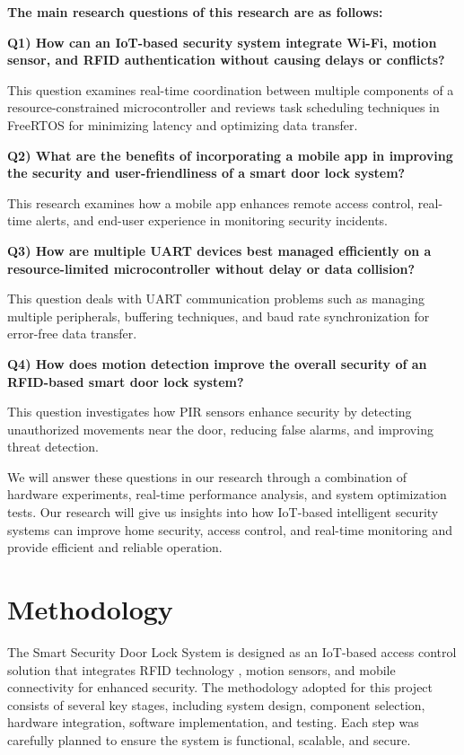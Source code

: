 \documentclass[a4paper]{scrartcl}
\begin{document}
\textbf{The main research questions of this research are as follows:
}
\vspace{8pt} %

\textbf{Q1) How can an IoT-based security system integrate Wi-Fi, motion sensor, and RFID authentication without causing delays or conflicts?}

This question examines real-time coordination between multiple components of a resource-constrained microcontroller and reviews task scheduling techniques in FreeRTOS for minimizing latency and optimizing data transfer.

\vspace{8pt}

\textbf{Q2) What are the benefits of incorporating a mobile app in improving the security and user-friendliness of a smart door lock system?}

This research examines how a mobile app enhances remote access control, real-time alerts, and end-user experience in monitoring security incidents.

\vspace{8pt}

\textbf{Q3) How are multiple UART devices best managed efficiently on a resource-limited microcontroller without delay or data collision?}

This question deals with UART communication problems such as managing multiple peripherals, buffering techniques, and baud rate synchronization for error-free data transfer.

\vspace{8pt}

\textbf{Q4) How does motion detection improve the overall security of an RFID-based smart door lock system?}

This question investigates how PIR sensors enhance security by detecting unauthorized movements near the door, reducing false alarms, and improving threat detection.

\vspace{12pt}

We will answer these questions in our research through a combination of hardware experiments, real-time performance analysis, and system optimization tests. Our research will give us insights into how IoT-based intelligent security systems can improve home security, access control, and real-time monitoring and provide efficient and reliable operation.

\section{Methodology}
\label{sec:methodology} 
The Smart Security Door Lock System is designed as an IoT-based access control solution
that integrates RFID technology \cite{BSI2025}, motion sensors, and mobile connectivity for enhanced
security. The methodology adopted for this project consists of several key stages, including
system design, component selection, hardware integration, software implementation, and
testing. Each step was carefully planned to ensure the system is functional, scalable, and
secure.
\end{document}
